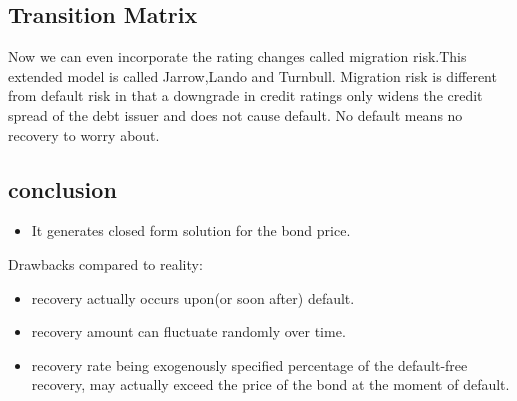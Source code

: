 \subsection{Transition Matrix}
Now we can even incorporate the rating changes called migration risk.This extended model is called Jarrow,Lando and Turnbull. Migration risk is different from default risk in that a downgrade in credit ratings only widens the credit spread of the debt issuer and does not cause default. No default means no recovery to worry about. 
\subsection{conclusion}
\begin{itemize}
    \item It generates closed form solution for the bond price.
\end{itemize}
Drawbacks compared to reality:
\begin{itemize}
    \item recovery actually occurs upon(or soon after) default.
    \item recovery amount can fluctuate randomly over time.
    \item recovery rate being exogenously specified percentage of the default-free recovery, may actually exceed the price of the bond at the moment of default. 
\end{itemize}

